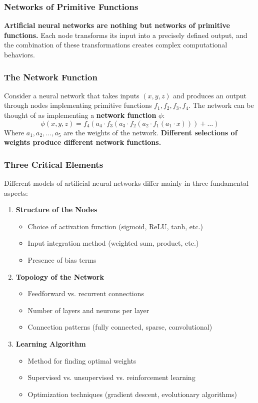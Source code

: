 \subsubsection{Networks of Primitive Functions}
\textbf{Artificial neural networks are nothing but networks of primitive functions.} Each node transforms its input into a precisely defined output, and the combination of these transformations creates complex computational behaviors.

\subsubsection{The Network Function}
Consider a neural network that takes inputs $(x, y, z)$ and produces an output through nodes implementing primitive functions $f_1, f_2, f_3, f_4$. The network can be thought of as implementing a \textbf{network function} $\phi$:
\[\phi(x, y, z) = f_4(a_4 \cdot f_3(a_3 \cdot f_2(a_2 \cdot f_1(a_1 \cdot x))) + \ldots)\]
Where $a_1, a_2, \ldots, a_5$ are the weights of the network. \textbf{Different selections of weights produce different network functions.}

\subsubsection{Three Critical Elements}
Different models of artificial neural networks differ mainly in three fundamental aspects:
\begin{enumerate}
    \item \textbf{Structure of the Nodes}
    \begin{itemize}
        \item Choice of activation function (sigmoid, ReLU, tanh, etc.)
        \item Input integration method (weighted sum, product, etc.)
        \item Presence of bias terms
    \end{itemize}
    \item \textbf{Topology of the Network}
    \begin{itemize}
        \item Feedforward vs. recurrent connections
        \item Number of layers and neurons per layer
        \item Connection patterns (fully connected, sparse, convolutional)
    \end{itemize}
    \item \textbf{Learning Algorithm}
    \begin{itemize}
        \item Method for finding optimal weights
        \item Supervised vs. unsupervised vs. reinforcement learning
        \item Optimization techniques (gradient descent, evolutionary algorithms)
    \end{itemize}
\end{enumerate}

